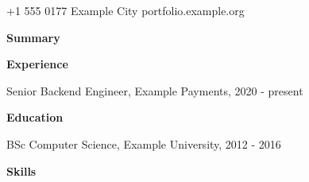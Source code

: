 \documentclass[10pt]{article}
\begin{document}
{\LARGE \Person}\par +1 555 0177 \quad Example City \quad portfolio.example.org\par\bigskip
\textbf{Summary}\par \Summary\par\medskip
\textbf{Experience}\par Senior Backend Engineer, Example Payments, 2020 - present\par
\JobA\par \JobB\par\medskip
\textbf{Education}\par BSc Computer Science, Example University, 2012 - 2016\par\medskip
\textbf{Skills}\par \SkillsLine\par
\end{document}
